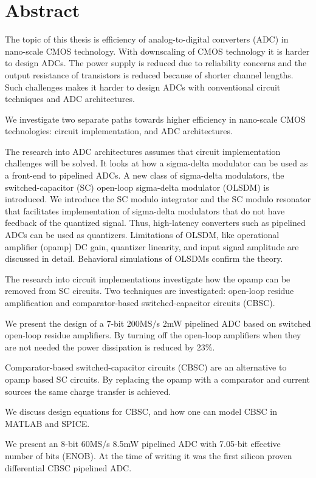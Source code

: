 \chapter*{Abstract}
The topic of this thesis is efficiency of analog-to-digital
converters (ADC) in nano-scale CMOS technology. With  downscaling of CMOS
technology it is  harder to design ADCs. The power supply is reduced due to reliability concerns and the output resistance of
transistors is reduced because of shorter channel lengths. Such
challenges makes it harder to design ADCs with conventional circuit
techniques and ADC architectures.

We investigate two separate paths towards higher efficiency
in nano-scale CMOS technologies: circuit implementation, and ADC architectures. 

The research into ADC architectures assumes that circuit
implementation challenges will be solved. It looks at how a sigma-delta modulator can
be used as a front-end to pipelined ADCs. A new class of sigma-delta
modulators, the switched-capacitor (SC) open-loop sigma-delta
modulator (OLSDM) is introduced. We introduce the SC modulo integrator
and the SC modulo resonator that facilitates implementation of
sigma-delta modulators that do not have feedback of the quantized
signal. Thus, high-latency converters such as pipelined ADCs can be
used as quantizers. Limitations of OLSDM, like operational amplifier (opamp) DC gain,  quantizer
linearity, and input signal amplitude are discussed in
detail. Behavioral simulations of OLSDMs confirm the theory. 


The research into circuit implementations investigate how the opamp can be
removed from SC circuits. Two techniques are
investigated: open-loop residue amplification and comparator-based
switched-capacitor circuits (CBSC). 

 We
present the design of a 7-bit 200MS/s 2mW pipelined ADC based on
switched open-loop residue amplifiers.  By turning off the open-loop
amplifiers when they are not needed the  power
dissipation is reduced by 23\%. 

Comparator-based switched-capacitor circuits (CBSC) are an alternative
to opamp based SC circuits. By replacing the opamp
with a comparator and current sources the same charge transfer is
achieved. 

We discuss design equations for CBSC, and how one can model CBSC in
MATLAB and SPICE.

We present an 8-bit 60MS/s 8.5mW pipelined ADC with 7.05-bit effective
number of bits (ENOB). At the time of writing
it was the first silicon
proven differential CBSC pipelined ADC. 


